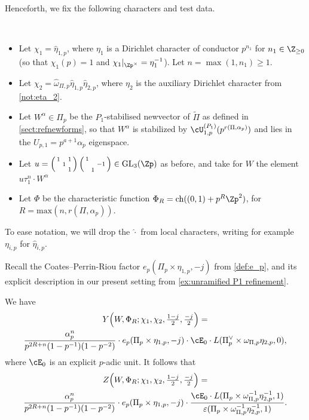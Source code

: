 \documentclass[10pt,reqno,a4paper]{amsart}
\newcommand{\Poref}{\tilde\Pi}
\newcommand{\omegahat}{\widehat{\omega}}
\newcommand{\etahat}{\widehat{\eta}}
\newcommand{\GL}{\mathrm{GL}}
\newcommand{\smallthreemat}[9]{\left(\begin{smallmatrix}
#1 & #2 & #3 \\
#4 & #5 & #6 \\
#7 & #8 & #9\end{smallmatrix}\right)}
\begin{document}
Henceforth, we fix the following characters and test data.  

\begin{notation}\label{not:test data p} \
\begin{itemize}\setlength{\itemsep}{0pt}
	\item Let  $\chi_1 = \etahat_{1, p}$, where $\eta_1$ is a Dirichlet character of conductor $p^{n_1}$ for $n_1 \in \Z_{\geq 0}$ (so that $\chi_1(p) = 1$ and $\chi_1|_{\Zp^\times} = \eta_1^{-1}$). Let $n = \max(1,n_1) \ge 1$.
	\item Let $\chi_2 = \omegahat_{\Pi, p} \etahat_{1, p}\etahat_{2, p}$, where $\eta_2$ is the auxiliary Dirichlet character from \cref{not:eta_2}.
	\item  Let $W^{\alpha} \in \Pi_p$ be the $P_1$-stabilised newvector of $\Poref$ as defined in \cref{sect:refnewforms}, so that $W^{\alpha}$ is stabilized by $\cU_{1,p}^{(P_1)}(p^{r(\Pi,\alpha_p)})$ and lies in the $U_{p,1} = p^{a+1}\alpha_p$ eigenspace.
	\item Let $u = \smallthreemat{1}{}{1}{}{1}{}{}{}{1}\smallthreemat{1}{}{}{}{}{-1}{}{1}{} \in \GL_3(\Zp)$ as before, and take for $W$ the element $u\tau_{ 1}^n  \cdot W^{\alpha}$

	\item Let $\Phi$ be the characteristic function $\Phi_R = \operatorname{ch}( (0, 1) + p^R \Zp^2)$, for $R = \mathrm{max}(n,r(\Pi,\alpha_p))$.
\end{itemize}
To ease notation, we will drop the $\widehat{\cdot}$ from local characters, writing for example $\eta_{i,p}$ for $\widehat{\eta}_{i,p}$.
\end{notation}

Recall the Coates--Perrin-Riou factor  $e_p(\Pi_p \times \eta_{1,p}, -j)$  from \cref{def:e_p}, and its explicit description in our present setting from \cref{ex:unramified P1 refinement}.
\begin{theorem}\label{thm:local zeta p}
We have
\begin{multline*}
	Y\Big(W, \Phi_R; \chi_1, \chi_2, \tfrac{1-j}{2}, \tfrac{-j}{2}\Big) = \\
	\frac{\alpha_p^n}{p^{2R + n}(1 - p^{-1})(1 - p^{-2})} \cdot e_p(\Pi_p \times \eta_{1,p}, -j) \cdot \cE_0 \cdot L(\Pi_p^\vee \times \omega_{\Pi,p}\eta_{2, p}, 0),
\end{multline*}
where $\cE_0$ is an explicit $p$-adic unit. It follows that
\begin{multline*}
	Z\Big(W, \Phi_R; \chi_1, \chi_2, \tfrac{1-j}{2}, \tfrac{-j}{2}\Big) = \\
	\frac{\alpha_p^n }{p^{2R + n}(1 - p^{-1})(1 - p^{-2})} \cdot e_p(\Pi_p \times \eta_{1,p}, -j) \cdot \frac{\cE_0 \cdot L(\Pi_p\times \omega_{\Pi,p}^{-1}\eta_{2, p}^{-1}, 1)}{\varepsilon(\Pi_p\times \omega_{\Pi,p}^{-1}\eta_{2, p}^{-1},1)}.
\end{multline*}
\end{theorem}
\end{document}
